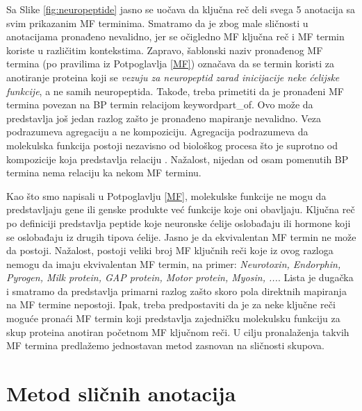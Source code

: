 Sa Slike \ref{fig:neuropeptide} jasno se uočava da ključna reč
 deli svega 5 anotacija sa svim prikazanim MF terminima.
Smatramo da je zbog male sličnosti u anotacijama pronađeno  nevalidno, jer se očigledno MF ključna reč  i
MF termin  koriste u različitim
kontekstima. Zapravo, šablonski naziv pronađenog MF termina (po pravilima iz
Potpoglavlja \ref{MF}) označava da se termin koristi za anotiranje proteina
koji se \textit{vezuju za neuropeptid zarad inicijacije neke ćelijske
funkcije}, a ne samih neuropeptida. Takođe, treba primetiti da je pronađeni MF
termina povezan na BP termin relacijom keyword{part\_of}.  Ovo može da
predstavlja još jedan razlog zašto je pronađeno mapiranje nevalidno.  Veza
 podrazumeva agregaciju a ne kompoziciju. Agregacija
podrazumeva da  molekulska funkcija postoji nezavisno od biološkog procesa što
je suprotno od kompozicije koja predstavlja relaciju . Nažalost,
nijedan od osam pomenutih BP termina nema relaciju  ka nekom MF
terminu.

\clearpage

Kao što smo napisali u Potpoglavlju \ref{MF}, molekulske funkcije ne mogu da
predstavljaju gene ili genske produkte već funkcije koje oni obavljaju. Ključna
reč  po definiciji predstavlja peptide koje neuronske
ćelije oslobađaju ili hormone koji se oslobađaju iz drugih tipova ćelije. Jasno
je da ekvivalentan MF termin ne može da postoji.  Nažalost, postoji veliki broj
MF ključnih reči koje iz ovog razloga nemogu da imaju ekvivalentan MF termin,
na primer: \textit{ Neurotoxin, Endorphin, Pyrogen, Milk protein, GAP protein,
Motor protein, Myosin, ...}. Lista je dugačka i smatramo da predstavlja primarni
razlog zašto skoro pola direktnih mapiranja na MF termine nepostoji.  Ipak,
treba predpostaviti da je za neke ključne reči moguće pronaći MF termin koji predstavlja
zajedničku molekulsku funkciju za skup proteina anotiran početnom MF ključnom reči.
U cilju pronalaženja takvih MF termina predlažemo jednostavan
metod zasnovan na sličnosti skupova.

\section{Metod sličnih anotacija}

